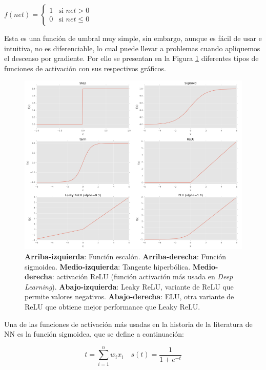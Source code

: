 \documentclass[a4paper,12pt]{article}
\begin{document}
$
f(net) =
\left\{
	\begin{array}{ll}
		1  	& \mbox{si } net > 0 \\
		0 	& \mbox{si } net \leq 0
	\end{array}
\right.
$

Esta es una función de umbral muy simple, sin embargo, aunque es fácil de usar e intuitiva, no es diferenciable, lo cual puede llevar a problemas cuando apliquemos el descenso por gradiente.
Por ello se presentan en la Figura \ref{fig:typesfactivation} diferentes tipos de funciones de activación con sus respectivos gráficos.

\begin{figure}[H]
	\begin{center}				
	\includegraphics[width=1\textwidth]{021.png}
  	\caption{\textbf{Arriba-izquierda}: Función escalón. \textbf{Arriba-derecha}: Función sigmoidea. \textbf{Medio-izquierda}: Tangente hiperbólica. \textbf{Medio-derecha}: activación ReLU (función activación más usada en \textit{Deep Learning}).
 \textbf{Abajo-izquierda}: Leaky ReLU, variante de ReLU que permite valores negativos. \textbf{Abajo-derecha}:
ELU, otra variante de ReLU que obtiene mejor performance que Leaky ReLU.}
  	\label{fig:typesfactivation}
  	\end{center}
\end{figure}

Una de las funciones de activación más usadas en la historia de la literatura de NN es la función sigmoidea, que se define a continuación:

\begin{equation}
t=\sum_{i=1}^{n}w_ix_i \quad s(t)=\frac{1}{1+e^{-t}}
\end{equation}
\end{document}
